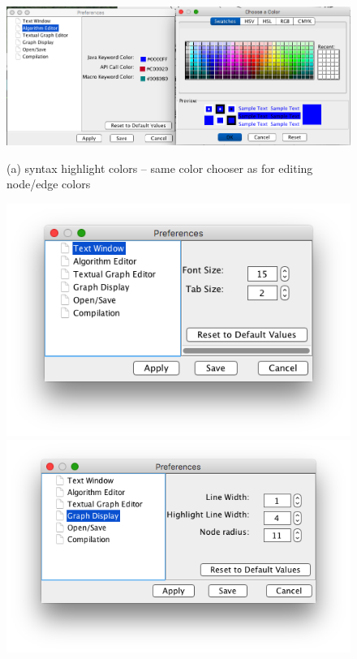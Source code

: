 \begin{figure}
  \centering

  \includegraphics[scale=0.45]{X-syntax_highlight_preference}

  (a) syntax highlight colors -- same color chooser as for editing node/edge
  colors

  \medskip
  \parbox{\textwidth}{
    \hspace*{-2em}
    \includegraphics[scale=0.45]{X-text_preference}
    \hspace{-3em}
    \includegraphics[scale=0.45]{X-graph_display_preference}
  }


\end{figure}
